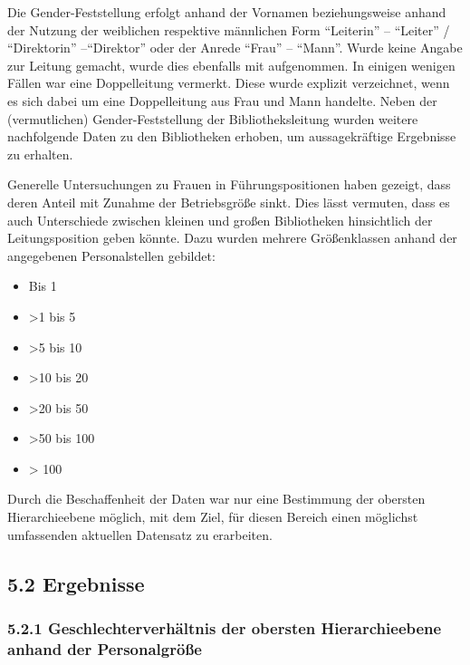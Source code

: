\documentclass[a4paper,
fontsize=11pt,
oneside,
numbers=noperiodatend,
parskip=half-,
bibliography=totoc,
final
]{scrartcl}
\begin{document}
Die Gender-Feststellung erfolgt anhand der Vornamen beziehungsweise
anhand der Nutzung der weiblichen respektive männlichen Form
\enquote{Leiterin} -- \enquote{Leiter} / \enquote{Direktorin}
--\enquote{Direktor} oder der Anrede \enquote{Frau} -- \enquote{Mann}.
Wurde keine Angabe zur Leitung gemacht, wurde dies ebenfalls mit
aufgenommen. In einigen wenigen Fällen war eine Doppelleitung vermerkt.
Diese wurde explizit verzeichnet, wenn es sich dabei um eine
Doppelleitung aus Frau und Mann handelte. Neben der (vermutlichen)
Gender-Feststellung der Bibliotheksleitung wurden weitere nachfolgende
Daten zu den Bibliotheken erhoben, um aussagekräftige Ergebnisse zu
erhalten.

Generelle Untersuchungen zu Frauen in Führungspositionen haben gezeigt,
dass deren Anteil mit Zunahme der Betriebsgröße sinkt. Dies lässt
vermuten, dass es auch Unterschiede zwischen kleinen und großen
Bibliotheken hinsichtlich der Leitungsposition geben könnte. Dazu wurden
mehrere Größenklassen anhand der angegebenen Personalstellen gebildet:

\begin{itemize}
\item
  Bis 1
\item
  \textgreater1 bis 5
\item
  \textgreater5 bis 10
\item
  \textgreater10 bis 20
\item
  \textgreater20 bis 50
\item
  \textgreater50 bis 100
\item
  \textgreater{} 100
\end{itemize}

Durch die Beschaffenheit der Daten war nur eine Bestimmung der obersten
Hierarchieebene möglich, mit dem Ziel, für diesen Bereich einen
möglichst umfassenden aktuellen Datensatz zu erarbeiten.

\hypertarget{ergebnisse}{%
\subsection{5.2 Ergebnisse}\label{ergebnisse}}

\hypertarget{geschlechterverhuxe4ltnis-der-obersten-hierarchieebene-anhand-der-personalgruxf6uxdfe}{%
\subsubsection{5.2.1 Geschlechterverhältnis der obersten Hierarchieebene
anhand der
Personalgröße}\label{geschlechterverhuxe4ltnis-der-obersten-hierarchieebene-anhand-der-personalgruxf6uxdfe}}
\end{document}
